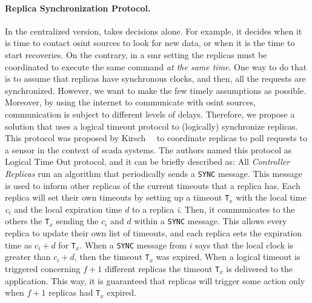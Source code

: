 \paragraph{Replica Synchronization Protocol.}
In the centralized version, \system takes decisions alone.
For example, it decides when it is time to contact \gls{osint} sources to look for new data, or when it is the time to start recoveries.
On the contrary, in a \gls{smr} setting the replicas must be coordinated to execute the same command \emph{at the same time}.
One way to do that is to assume that replicas have synchronous clocks, and then, all the requests are synchronized.
However, we want to make the few timely assumptions as possible.
Moreover, by using the internet to communicate with \gls{osint} sources, \system communication is subject to different levels of delays.
Therefore, we propose a solution that uses a logical timeout protocol to (logically) synchronize replicas.
This protocol was proposed by Kirsch~\etal{}~\cite{Kirsch:2014} to coordinate replicas to poll requests to a sensor in the context of \gls{scada} systems.
The authors named this protocol as Logical Time Out protocol, and it can be briefly described as:
All \emph{Controller Replicas} run an algorithm that periodically sends a \texttt{SYNC} message.
This message is used to inform other replicas of the current timeouts that a replica has.
Each replica will set their own timeouts by setting up a timeout \texttt{T$_x$} with the local time \emph{c$_i$} and the local expiration time \emph{$d$} to a replica \emph{i}.
Then, it communicates to the others the \texttt{T$_x$} sending the \emph{$c_i$} and \emph{$d$} within a \texttt{SYNC} message.
This allows every replica to update their own list of timeouts, and each replica sets the expiration time as \emph{$c_i + d$} for \texttt{T$_x$}.
When a \texttt{SYNC} message from $i$ says that the local clock is greater than \emph{$c_i + d$}, then the timeout \texttt{T$_x$} was expired.
When a logical timeout is triggered concerning $f+1$ different replicas the timeout \texttt{T$_x$} is delivered to the application.
This way, it is guaranteed that replicas will trigger some action only when $f+1$ replicas had \texttt{T$_x$} expired.
 



